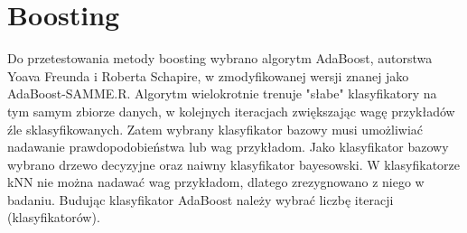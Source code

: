 \section{Boosting}
Do przetestowania metody boosting wybrano algorytm AdaBoost, autorstwa Yoava Freunda i Roberta Schapire, w zmodyfikowanej wersji znanej jako AdaBoost-SAMME.R. Algorytm wielokrotnie trenuje "słabe" klasyfikatory na tym samym zbiorze danych, w kolejnych iteracjach zwiększając wagę przykładów źle sklasyfikowanych. Zatem wybrany klasyfikator bazowy musi umożliwiać nadawanie prawdopodobieństwa lub wag przykładom. Jako klasyfikator bazowy wybrano drzewo decyzyjne oraz naiwny klasyfikator bayesowski. W klasyfikatorze kNN nie można nadawać wag przykładom, dlatego zrezygnowano z niego w badaniu. Budując klasyfikator AdaBoost należy wybrać liczbę iteracji (klasyfikatorów).

